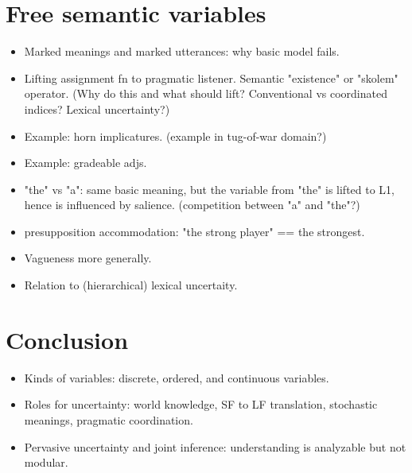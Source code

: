 \documentclass[12pt]{article}
\begin{document}
\section{Free semantic variables}
\begin{itemize}
\item   Marked meanings and marked utterances: why basic model fails.
\item  Lifting assignment fn to pragmatic listener. Semantic "existence" or "skolem" operator.  (Why do this and what should lift? Conventional vs coordinated indices? Lexical uncertainty?)
\item  Example: horn implicatures. (example in tug-of-war domain?)
\item  Example: gradeable adjs.
\item  "the" vs "a": same basic meaning, but the variable from "the" is lifted to L1, hence is influenced by salience. (competition between "a" and "the"?)
\item  presupposition accommodation: "the strong player" == the strongest.
\item  Vagueness more generally.
\item  Relation to (hierarchical) lexical uncertaity.
\end{itemize}



\section{Conclusion}
\begin{itemize}
\item  Kinds of variables: discrete, ordered, and continuous variables.
\item  Roles for uncertainty: world knowledge, SF to LF translation, stochastic meanings, pragmatic coordination.
\item  Pervasive uncertainty and joint inference: understanding is analyzable but not modular.
\end{itemize}
\end{document}
